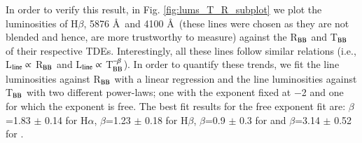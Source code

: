 \documentclass[structabstract]{aa}
\begin{document}
In order to verify this result, in Fig. \ref{fig:lums_T_R_subplot} we plot the luminosities of H$\beta$,  5876 \AA\, and  4100 \AA\, (these lines were chosen as they are not blended and hence, are more trustworthy to measure) against the R$_{\rm BB}$ and T$_{\rm BB}$ of their respective TDEs. Interestingly, all these lines follow similar relations (i.e., L$_{\rm line} \propto$ R$_{\rm BB}$ and L$_{\rm line} \propto$ T$_{\rm BB}^{-\beta}$). In order to quantify these trends, we fit the line luminosities against R$_{\rm BB}$ with a linear regression and the line luminosities against T$_{\rm BB}$ with two different power-laws; one with the exponent fixed at $-$2 and one for which the exponent is free. The best fit results for the free exponent fit are: $\beta$=1.83 $\pm$ 0.14 for H$\alpha$, $\beta$=1.23 $\pm$ 0.18 for H$\beta$, $\beta$=0.9 $\pm$ 0.3 for  and $\beta$=3.14 $\pm$ 0.52 for .




\end{document}
